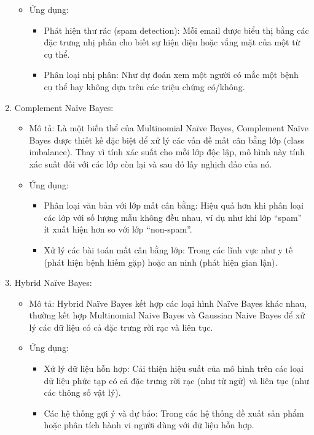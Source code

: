 \begin{enumerate}
\begin{itemize}
    \item Ứng dụng:
    \begin{itemize}
        \item Phát hiện thư rác (spam detection): Mỗi email được biểu thị bằng các đặc trưng nhị phân cho biết sự hiện diện hoặc vắng mặt của một từ cụ thể.
        \item Phân loại nhị phân: Như dự đoán xem một người có mắc một bệnh cụ thể hay không dựa trên các triệu chứng có/không.
    \end{itemize}
\end{itemize}
\item Complement Naïve Bayes:
\begin{itemize}
    \item Mô tả: Là một biến thể của Multinomial Naïve Bayes, Complement Naïve Bayes được thiết kế đặc biệt để xử lý các vấn đề mất cân bằng lớp (class imbalance). Thay vì tính xác suất cho mỗi lớp độc lập, mô hình này tính xác suất đối với các lớp còn lại và sau đó lấy nghịch đảo của nó.
    \item Ứng dụng:
    \begin{itemize}
        \item Phân loại văn bản với lớp mất cân bằng: Hiệu quả hơn khi phân loại các lớp với số lượng mẫu không đều nhau, ví dụ như khi lớp “spam” ít xuất hiện hơn so với lớp “non-spam”.
        \item Xử lý các bài toán mất cân bằng lớp: Trong các lĩnh vực như y tế (phát hiện bệnh hiếm gặp) hoặc an ninh (phát hiện gian lận).
    \end{itemize}
\end{itemize}
\item Hybrid Naïve Bayes:
\begin{itemize}
    \item Mô tả: Hybrid Naïve Bayes kết hợp các loại hình Naïve Bayes khác nhau, thường kết hợp Multinomial Naive Bayes và Gaussian Naive Bayes để xử lý các dữ liệu có cả đặc trưng rời rạc và liên tục.
\clearpage
    \item Ứng dụng:
    \begin{itemize}
        \item Xử lý dữ liệu hỗn hợp: Cải thiện hiệu suất của mô hình trên các loại dữ liệu phức tạp có cả đặc trưng rời rạc (như từ ngữ) và liên tục (như các thông số vật lý).
        \item Các hệ thống gợi ý và dự báo: Trong các hệ thống đề xuất sản phẩm hoặc phân tích hành vi người dùng với dữ liệu hỗn hợp.
    \end{itemize}

\end{itemize}
\end{enumerate}
